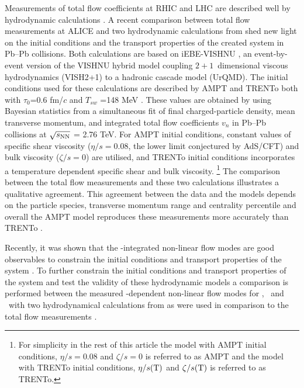 Measurements of total flow coefficients at RHIC and LHC are described well by hydrodynamic calculations \cite{Xu:2016hmp, McDonald:2016vlt, Zhao:2017yhj}. A recent comparison between total flow measurements at ALICE \cite{Acharya:2018zuq} and two hydrodynamic calculations from \cite{Zhao:2017yhj} shed new light on the initial conditions and the transport properties of the created system in Pb--Pb collisions. Both calculations are based on iEBE-VISHNU \cite{Shen:2014vra}, an event-by-event version of the VISHNU hybrid model \cite{Song:2010aq} coupling $2+1$~dimensional viscous hydrodynamics (VISH2+1) \cite{Song:2007fn} to a hadronic cascade model (UrQMD). The initial conditions used for these calculations are described by AMPT \cite{Lin:2004en} and TRENTo \cite{Moreland:2014oya} both with $\tau_{0}$=0.6 fm/$c$ and $T_{sw}$ =148 MeV \cite{Bernhard:2016tnd}. These values are obtained by using Bayesian statistics from a simultaneous fit of final charged-particle density, mean transverse momentum, and integrated total flow coefficients $v_{n}$ in Pb--Pb collisions at $\sqrt{s_{\rm NN}}$ = 2.76 TeV. For  AMPT initial conditions, constant values of specific shear viscosity ($\eta/s =0.08$, the lower limit conjectured by AdS/CFT) and bulk viscosity ($\zeta/s = 0$) are utilised, and TRENTo \cite{Moreland:2014oya} initial conditions incorporates a temperature dependent specific shear and bulk viscosity. \footnote{ For simplicity in the rest of this article the model with AMPT initial conditions, $\eta/s =0.08$ and $\zeta/s =0$ is referred to as AMPT and the model with TRENTo initial conditions, $\eta/s(\rm{T})$ and $\zeta/s(\rm{T})$ is referred to as TRENTo.} The comparison between the total flow measurements and these two calculations illustrates a qualitative agreement. This agreement between the data and the models depends on the particle species, transverse momentum range and centrality percentile and overall the AMPT model reproduces these measurements more accurately than TRENTo \cite{Acharya:2018zuq}.

Recently, it was shown that the \pT-integrated non-linear flow modes are good observables to constrain the initial conditions and transport properties of the system \cite{Acharya:2017zfg}. To further constrain the initial conditions and transport properties of the system and test the validity of these hydrodynamic models a comparison is performed between the measured \pT-dependent non-linear flow modes for \pion, \kaon~and \proton~with two hydrodynamical calculations from \cite{Zhao:2017yhj} as were used in comparison to the total flow measurements \cite{Acharya:2018zuq}. 


